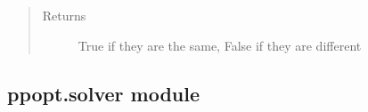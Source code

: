 \documentclass[letterpaper,10pt,english]{sphinxmanual}
\begin{document}
\begin{fulllineitems}
\begin{fulllineitems}
\begin{quote}
\begin{description}
\item[{Returns}] \leavevmode
\sphinxAtStartPar
True if they are the same, False if they are different

\end{description}\end{quote}

\end{fulllineitems}


\end{fulllineitems}



\subsection{ppopt.solver module}
\label{\detokenize{ppopt:module-ppopt.solver}}\label{\detokenize{ppopt:ppopt-solver-module}}
\end{document}

